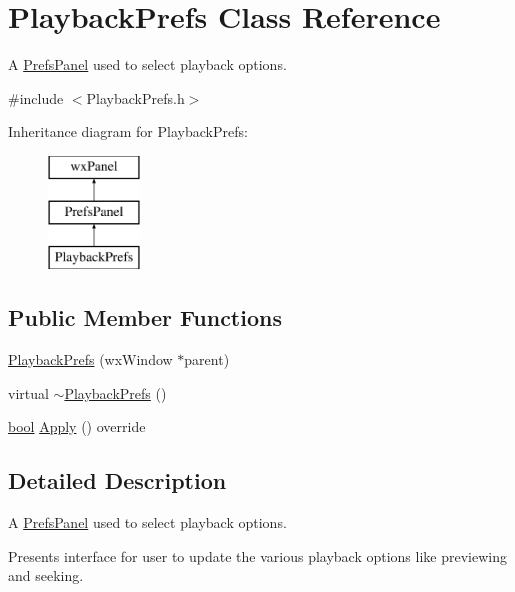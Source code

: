 \hypertarget{class_playback_prefs}{}\section{Playback\+Prefs Class Reference}
\label{class_playback_prefs}


A \hyperlink{class_prefs_panel}{Prefs\+Panel} used to select playback options.  




{\ttfamily \#include $<$Playback\+Prefs.\+h$>$}

Inheritance diagram for Playback\+Prefs\+:\begin{figure}[H]
\begin{center}
\leavevmode
\includegraphics[height=3.000000cm]{class_playback_prefs}
\end{center}
\end{figure}
\subsection*{Public Member Functions}
\begin{DoxyCompactItemize}
\item 
\hyperlink{class_playback_prefs_a3de480972c7c85b1d572f44570fa9084}{Playback\+Prefs} (wx\+Window $\ast$parent)
\item 
virtual \hyperlink{class_playback_prefs_aabcc04050f29860b7c61ee6bc56451a8}{$\sim$\+Playback\+Prefs} ()
\item 
\hyperlink{mac_2config_2i386_2lib-src_2libsoxr_2soxr-config_8h_abb452686968e48b67397da5f97445f5b}{bool} \hyperlink{class_playback_prefs_ab7c2db6d8f1478699a1e044cceb22046}{Apply} () override
\end{DoxyCompactItemize}


\subsection{Detailed Description}
A \hyperlink{class_prefs_panel}{Prefs\+Panel} used to select playback options. 

Presents interface for user to update the various playback options like previewing and seeking. 

